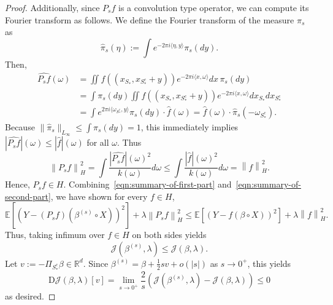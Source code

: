 \documentclass[sn-mathphys-num]{sn-jnl}%
\numberwithin{equation}{section}
\newcommand{\R}{\mathbb{R}}
\newcommand{\E}{\mathbb{E}}
\newcommand{\norm}[1]{\left\|{#1}\right\|} %
\newcommand{\half}{\frac{1}{2}}
\theoremstyle{thmstyleone}%
\theoremstyle{thmstyletwo}%
\theoremstyle{thmstylethree}%
\begin{document}
\begin{proof}
Additionally, since $P_s f$ is a convolution type operator, we can compute its Fourier transform as follows. 
We define the Fourier transform of the measure $\pi_s$ as
\begin{equation*}
	 \widehat{ \pi}_s (\eta):= \int e^{-2 \pi i\langle \eta, y\rangle} \pi_s(dy).
\end{equation*}
Then,
\begin{equation*}
\begin{split}
	\widehat {P_s f} (\omega) &= \iint f((x_{S_*}, x_{S_*^c} + y))  e^{-2 \pi i\langle x, \omega\rangle} dx\, \pi_s(dy) \\
	&= \int \pi_s(dy)  \iint f((x_{S_*}, x_{S_*^c} + y))e^{-2 \pi i\langle x, \omega\rangle} dx_{S_*} dx_{S_*^c} \\
	&= \int e^{2\pi i\langle \omega_{S_*^c}, y\rangle}  \pi_s(dy)  \cdot \widehat{f}(\omega) %
	 = \widehat{f}(\omega) \cdot \widehat{ \pi}_s (-\omega_{S_*^c}).
\end{split} 
\end{equation*}
Because $\|\widehat{\pi}_s\|_{L_\infty} \le \int \pi_s(dy) = 1$, this immediately implies 
$|\widehat {P_s f}|(\omega) \le |\widehat f|(\omega)$ for all $\omega$. Thus
\begin{equation}
\label{eqn:summary-of-second-part}
	\norm{P_s f}_H^2 = \int \frac{|\widehat {P_s f}|(\omega)^2}{k(\omega)} d\omega
		\le \int \frac{|\widehat {f} |(\omega)^2}{k(\omega)} d\omega = \norm{f}_H^2.
\end{equation}  
Hence, $P_s f \in H$. 
Combining~\eqref{eqn:summary-of-first-part} and~\eqref{eqn:summary-of-second-part}, we have shown for every $f \in H$, 
\begin{equation*}
	\E[(Y - (P_s f)(\beta^{(s)} \circ X))^2] + \lambda 	\norm{P_s f}_H^2
		\le  \E[(Y - f(\beta \circ X))^2] + \lambda \norm{f}_H^2.
\end{equation*}
Thus, taking infimum over $f \in H$ on both sides yields 
\begin{equation}
\label{eqn:J-decrease}
	\mathcal{J}(\beta^{(s)}, \lambda) \le \mathcal{J}(\beta, \lambda).
\end{equation} 
Let $v := -\Pi_{S_*^c} \beta \in \R^d$. Since $\beta^{(s)} = \beta + \half s v + o(|s|)$ as $s \to 0^+$, this yields 
\begin{equation*}
	\mathrm{D}\mathcal{J}(\beta, \lambda)[v] =  \lim_{s \to 0^+} \frac{2}{s} ( \mathcal{J}(\beta^{(s)}, \lambda) - \mathcal{J}(\beta, \lambda)) \le 0
\end{equation*} 
as desired. 
 

\end{proof}
\end{document}
